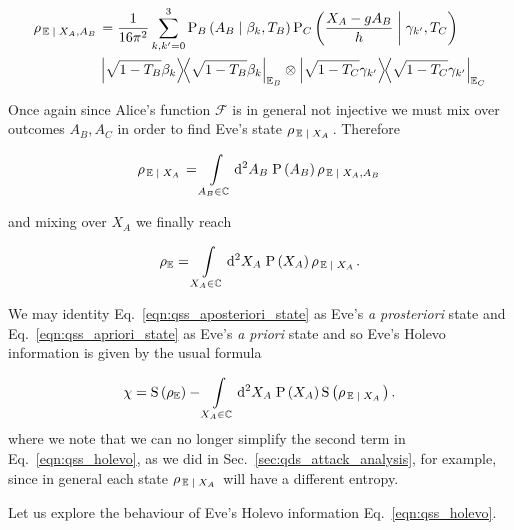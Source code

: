 \begin{align}\label{eqn:qss_deriv_8}
\rho_{\left. \mathbb{E} \given X_A, A_B\right.} &= \frac{1}{16 \pi^2} \sum_{k, k^\prime = 0}^3 \text{P}_B\left(A_B \given \beta_k, T_B\right) \text{P}_C\left(\frac{X_A - g A_B}{h} \given \gamma_{k^\prime}, T_C\right) \notag \\
%
&\dyad{\sqrt{1-T_B} \beta_k}_{\mathbb{E}_B} \otimes \dyad{\sqrt{1-T_C}\gamma_{k^\prime}}_{\mathbb{E}_C}
\end{align}

\noindent Once again since Alice's function $\mathcal{F}$ is in general not injective we must mix over outcomes $A_B, A_C$ in order to find Eve's state $\rho_{\left.\mathbb{E} \; \middle| \; X_A\right.}$. Therefore 

\begin{equation}\label{eqn:qss_aposteriori_state}
\rho_{\left.\mathbb{E} \; \middle| \; X_A\right.} = \int\limits_{A_B \in \mathbb{C}} \mathop{}\!\mathrm{d^2} A_B \; \text{P}\left(A_B\right) \rho_{\left.\mathbb{E} \; \middle| \; X_A, A_B\right.}
\end{equation}

\noindent and mixing over $X_A$ we finally reach

\begin{equation}\label{eqn:qss_apriori_state}
\rho_{\mathbb{E}} = \int\limits_{X_A \in \mathbb{C}} \mathop{}\!\mathrm{d^2} X_A \; \text{P}\left(X_A\right) \rho_{\left.\mathbb{E}\; \middle| \; X_A\right.}.
\end{equation}

\noindent We may identity Eq.~\ref{eqn:qss_aposteriori_state} as Eve's \emph{a prosteriori} state and Eq.~\ref{eqn:qss_apriori_state} as Eve's \emph{a priori} state and so Eve's Holevo information is given by the usual formula

\begin{equation}\label{eqn:qss_holevo}
\chi = \text{S}\left(\rho_\mathbb{E}\right) - \int\limits_{X_A \in \mathbb{C}} \mathop{}\!\mathrm{d^2} X_A \; \text{P}\left(X_A\right) \text{S}\left(\rho_{\left.\mathbb{E} \; \middle| \; X_A\right.}\right).
\end{equation}
where we note that we can no longer simplify the second term in Eq.~\ref{eqn:qss_holevo}, as we did in Sec.~\ref{sec:qds_attack_analysis}, for example, since in general each state $\rho_{\left.\mathbb{E} \; \middle| \; X_A\right.}$ will have a different entropy.


\noindent Let us explore the behaviour of Eve's Holevo information Eq.~\ref{eqn:qss_holevo}.


